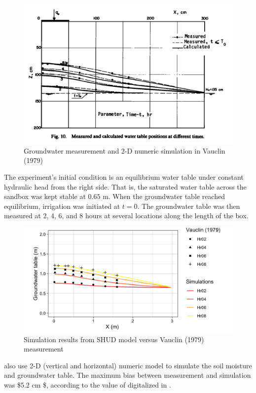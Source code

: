 \documentclass[
]{scrbook}
\begin{document}
\begin{figure}
\centering
\includegraphics{Fig/Example/Vauclin/v1.png}
\caption{Groundwater measurement and 2-D numeric simulation in Vauclin (1979)}
\end{figure}

The experiment's initial condition is an equilibrium water table under constant hydraulic head from the right side. That is, the saturated water table across the sandbox was kept stable at \(0.65\) m. When the groundwater table reached equilibrium, irrigation was initiated at \(t = 0\). The groundwater table was then measured at 2, 4, 6, and 8 hours at several locations along the length of the box.

\begin{figure}
\centering
\includegraphics{Fig/Example/Vauclin/best.png}
\caption{Simulation results from SHUD model versus Vauclin (1979) measurement}
\end{figure}

\citep{Vauclin1979} also use 2-D (vertical and horizontal) numeric model to simulate the soil moisture and groundwater table. The maximum bias between measurement and simulation was \$5.2 cm \$, according to the value of digitalized in \citealp[Fig. 10]{Vauclin1979}.
\end{document}
